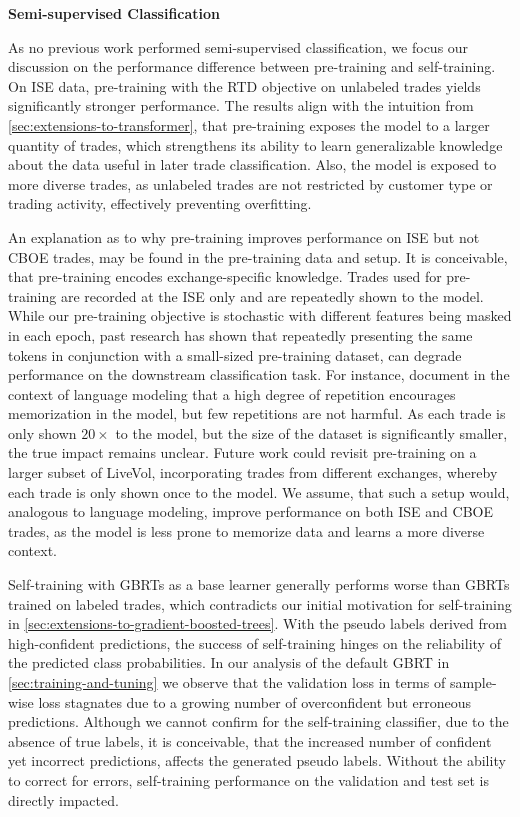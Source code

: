 
\textbf{Semi-supervised Classification}

As no previous work performed semi-supervised classification, we focus our discussion on the performance difference between pre-training and self-training. On \gls{ISE} data, pre-training with the \gls{RTD} objective on unlabeled trades yields significantly stronger performance. The results align with the intuition from \cref{sec:extensions-to-transformer}, that pre-training exposes the model to a larger quantity of trades, which strengthens its ability to learn generalizable knowledge about the data useful in later trade classification. Also, the model is exposed to more diverse trades, as unlabeled trades are not restricted by customer type or trading activity, effectively preventing overfitting.  

An explanation as to why pre-training improves performance on \gls{ISE} but not \gls{CBOE} trades, may be found in the pre-training data and setup. It is conceivable, that pre-training encodes exchange-specific knowledge. Trades used for pre-training are recorded at the \gls{ISE} only and are repeatedly shown to the model. While our pre-training objective is stochastic with different features being masked in each epoch, past research has shown that repeatedly presenting the same tokens in conjunction with a small-sized pre-training dataset, can degrade performance on the downstream classification task. For instance, \textcite[][27--28]{raffelExploringLimitsTransfer2020} document in the context of language modeling that a high degree of repetition encourages memorization in the model, but few repetitions are not harmful. As each trade is only shown $20\times$ to the model, but the size of the dataset is significantly smaller, the true impact remains unclear. Future work could revisit pre-training on a larger subset of LiveVol, incorporating trades from different exchanges, whereby each trade is only shown once to the model. We assume, that such a setup would, analogous to language modeling, improve performance on both \gls{ISE} and \gls{CBOE} trades, as the model is less prone to memorize data and learns a more diverse context.

Self-training with \glspl{GBRT} as a base learner generally performs worse than \glspl{GBRT} trained on labeled trades, which contradicts our initial motivation for self-training in \cref{sec:extensions-to-gradient-boosted-trees}. With the pseudo labels derived from high-confident predictions, the success of self-training hinges on the reliability of the predicted class probabilities. In our analysis of the default \gls{GBRT} in \cref{sec:training-and-tuning} we observe that the validation loss in terms of sample-wise loss stagnates due to a growing number of overconfident but erroneous predictions. Although we cannot confirm for the self-training classifier, due to the absence of true labels, it is conceivable, that the increased number of confident yet incorrect predictions, affects the generated pseudo labels. Without the ability to correct for errors, self-training performance on the validation and test set is directly impacted.

